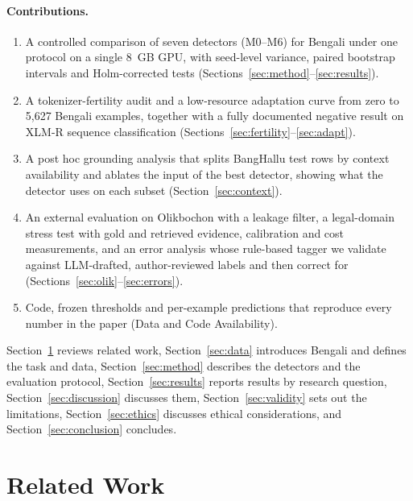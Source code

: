 \documentclass[manuscript,screen,review]{acmart}
\begin{document}
\paragraph{Contributions.}
\begin{enumerate}
\item A controlled comparison of seven detectors (M0--M6) for Bengali under one protocol on a single 8~GB GPU, with seed-level variance, paired bootstrap intervals and Holm-corrected tests (Sections~\ref{sec:method}--\ref{sec:results}).
\item A tokenizer-fertility audit and a low-resource adaptation curve from zero to 5,627 Bengali examples, together with a fully documented negative result on XLM-R sequence classification (Sections~\ref{sec:fertility}--\ref{sec:adapt}).
\item A post hoc grounding analysis that splits BangHallu test rows by context availability and ablates the input of the best detector, showing what the detector uses on each subset (Section~\ref{sec:context}).
\item An external evaluation on Olikbochon with a leakage filter, a legal-domain stress test with gold and retrieved evidence, calibration and cost measurements, and an error analysis whose rule-based tagger we validate against LLM-drafted, author-reviewed labels and then correct for (Sections~\ref{sec:olik}--\ref{sec:errors}).
\item Code, frozen thresholds and per-example predictions that reproduce every number in the paper (Data and Code Availability).
\end{enumerate}

Section~\ref{sec:related} reviews related work, Section~\ref{sec:data} introduces Bengali and defines the task and data, Section~\ref{sec:method} describes the detectors and the evaluation protocol, Section~\ref{sec:results} reports results by research question, Section~\ref{sec:discussion} discusses them, Section~\ref{sec:validity} sets out the limitations, Section~\ref{sec:ethics} discusses ethical considerations, and Section~\ref{sec:conclusion} concludes.

\section{Related Work}\label{sec:related}
\end{document}
